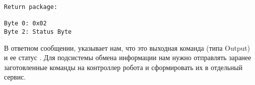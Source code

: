 \begin{lstlisting}[caption=Формат команды ответа]
Return package:

Byte 0: 0x02
Byte 2: Status Byte
\end{lstlisting}
В ответном сообщении,  указывает нам, что это выходная команда (типа Output) и ее статус .
Для подсистемы обмена информации нам нужно отправлять заранее заготовленные команды на контроллер робота и сформировать их в отдельный сервис.

